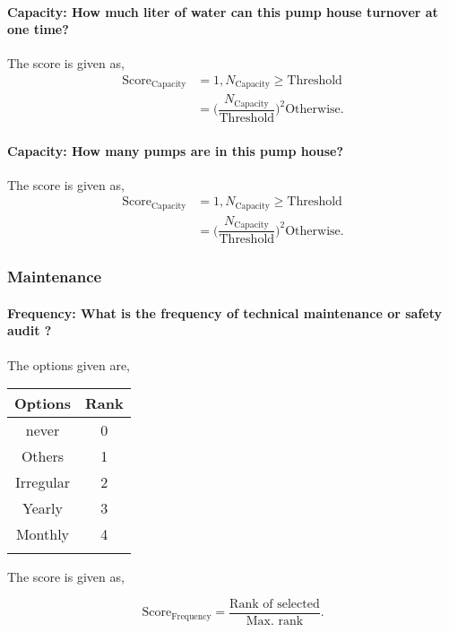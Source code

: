 \documentclass[oneside,twocolumn]{article}
\newcommand{\tsub}[2]{\text{#1}_{\text{#2}}}
\newcommand{\tsubb}[2]{#1_{\text{#2}}}
\newcommand{\dsub}[2]{\dfrac{\text{#1}}{\text{#2}}}
\newcommand{\singsel}[1]
{
	\[
		\tsub{Score}{#1} = \dsub{Rank of selected}{Max. rank}.
	\]
}
\newenvironment{ttable}
{
\begin{center}
\begin{tabular}{c|c}
\hline
}
{
\\ \hline
\end{tabular}
\end{center}
}
\begin{document}
\paragraph{Capacity: How much liter of water can this pump house turnover at one time?}

The score is given as,
\begin{align*}
\tsub{Score}{Capacity} &= 1, \tsubb{N}{Capacity} \ge \text{Threshold} \\
        &=
\Big(\dfrac{\tsubb{N}{Capacity}}{\text{Threshold}}\Big)^{2}
\text{Otherwise}.
\end{align*}
\paragraph{Capacity: How many pumps are in this pump house?}

The score is given as,
\begin{align*}
\tsub{Score}{Capacity} &= 1, \tsubb{N}{Capacity} \ge \text{Threshold} \\
        &=
\Big(\dfrac{\tsubb{N}{Capacity}}{\text{Threshold}}\Big)^{2}
\text{Otherwise}.
\end{align*}
\subsubsection{Maintenance}

\paragraph{Frequency: What is the frequency of technical maintenance or safety audit ?}

The options given are,
\begin{ttable}
Options & Rank \\ \hline
never & 0 \\
Others & 1 \\
Irregular & 2 \\
Yearly & 3 \\
Monthly & 4 \\
\hline
\end{ttable}
The score is given as,
\singsel{Frequency}
\end{document}
